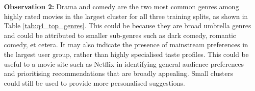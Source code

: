 \documentclass[12pt, a4paper]{article}
\begin{document}
\textbf{Observation 2:}
Drama and comedy are the two most common genres among highly rated movies in the largest cluster for all three training splits, as shown in Table \ref{tab:q4_top_genres}.
This could be because they are broad umbrella genres and could be attributed to smaller sub-genres such as dark comedy, romantic comedy, et cetera.
It may also indicate the presence of mainstream preferences in the largest user group, rather than highly specialised taste profiles.
This could be useful to a movie site such as Netflix in identifying general audience preferences and prioritising recommendations that are broadly appealing.
Small clusters could still be used to provide more personalised suggestions.
\end{document}
